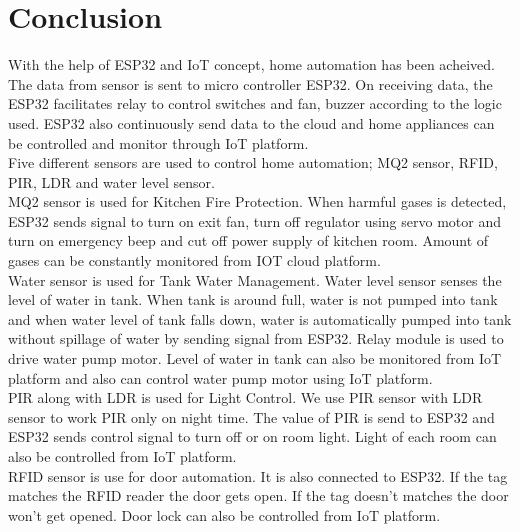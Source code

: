 \documentclass[12pt,a4paper]{report}
\begin{document}
	
	\section{Conclusion}
	
	\begin{justify}
		

   
    
    	With the help of ESP32 and  IoT concept, home automation has been acheived. The data from  sensor is sent to micro controller ESP32. On receiving data, the ESP32 facilitates relay to control switches and fan, buzzer according to the logic used. ESP32 also continuously send data to the cloud and  home appliances can be controlled and monitor through IoT platform. \\
    Five different sensors are used to control home automation; MQ2 sensor, RFID, PIR, LDR and water level sensor.\\
    MQ2 sensor is used for Kitchen Fire Protection. When harmful gases is detected, ESP32 sends signal to turn on exit fan, turn off regulator using servo motor and turn on emergency beep and cut off power supply of kitchen room. Amount of gases can be constantly monitored from IOT cloud platform.\\
    Water sensor is used for Tank Water Management. Water level sensor senses the level of water in tank. When tank is around full, water is not pumped into tank and when water level of tank falls down, water is automatically pumped into tank without spillage of water by sending signal from ESP32. Relay module is used to drive water pump motor. Level of water in tank can also be monitored from IoT platform and also can control water pump motor using IoT platform.\\
    PIR along with LDR  is used for Light Control.  We use PIR sensor with LDR sensor to work PIR only on night time. The value of PIR is send to ESP32 and ESP32 sends control signal to turn off or on room light. Light of each room can also be controlled from IoT platform.\\ 
    RFID sensor is use for door automation. It is also connected to ESP32. If the tag matches the RFID reader the door gets open. If the tag doesn't matches the door won't get opened. Door lock can also be controlled from IoT platform.
	
		\end{justify}
\end{document}
